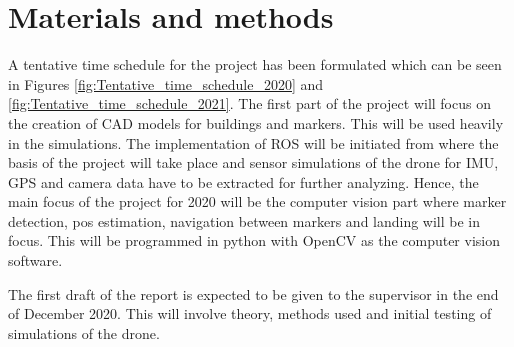 \documentclass[../Head/Report.tex]{subfiles}
\begin{document}
\section{Materials and methods}

A tentative time schedule for the project has been formulated which can be seen in Figures \ref{fig:Tentative_time_schedule_2020} and \ref{fig:Tentative_time_schedule_2021}. The first part of the project will focus on the creation of CAD models for buildings and markers. This will be used heavily in the simulations. The implementation of ROS will be initiated from where the basis of the project will take place and sensor simulations of the drone for IMU, GPS and camera data have to be extracted for further analyzing. Hence, the main focus of the project for 2020 will be the computer vision part where marker detection, pos estimation, navigation between markers and landing will be in focus. This will be programmed in python with OpenCV as the computer vision software. 

The first draft of the report is expected to be given to the supervisor in the end of December 2020. This will involve theory, methods used and initial testing of simulations of the drone.     

%
\newcommand{\myWeek}{\themyWeekNum
    \stepcounter{myWeekNum}
    \ifnum\themyWeekNum=53
         \setcounter{myWeekNum}{1}
    \else\fi
}
\end{document}

